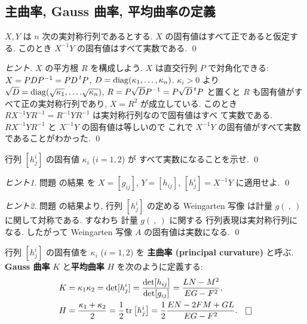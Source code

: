 \documentclass[12pt,twoside]{jarticle}
\begin{document}

\subsection{主曲率, Gauss 曲率, 平均曲率の定義}

\begin{question}[線形代数からの準備]
 \label{q:XinvY}
 $X,Y$ は $n$ 次の実対称行列であるとする.
 $X$ の固有値はすべて正であると仮定する.
 このとき $X^{-1}Y$ の固有値はすべて実数である.
 \qed
\end{question}

\begin{proof}[ヒント]
 $X$ の平方根 $R$ を構成しよう.
 $X$ は直交行列 $P$ で対角化できる: %
 $X=PDP^{-1}=PD\tp{P}$, $D=\mathop{\mathrm{diag}}\nolimits(\kappa_1,\ldots,\kappa_n)$.
 $\kappa_i>0$ より $\sqrt{D} = \mathop{\mathrm{diag}}\nolimits(\sqrt{\kappa_1},\ldots.\sqrt{\kappa_n})$, 
 $R = P\sqrt{D}P^{-1}=P\sqrt{D}\tp{P}$ と置くと %
 $R$ も固有値がすべて正の実対称行列であり, $X=R^2$ が成立している.
 このとき $RX^{-1}YR^{-1}=R^{-1}YR^{-1}$ は実対称行列なので固有値はすべ
 て実数である. $RX^{-1}YR^{-1}$ と $X^{-1}Y$ の固有値は等しいので
 これで $X^{-1}Y$ の固有値がすべて実数であることがわかった.
 \qed
\end{proof}

\begin{question}
 行列 $[h^i_j]$ の固有値 $\kappa_i$ ($i=1,2$) が
 すべて実数になることを示せ.
 \qed
\end{question}

\begin{proof}[ヒント1]
 問題  の結果
 を $X=[g_{ij}]$, $Y=[h_{ij}]$, $[h^i_j] = X^{-1}Y $ に適用せよ. \qed
\end{proof}

\begin{proof}[ヒント2]
 問題  の結果より, 行列 $[h^i_j]$ の定める Weingarten 写像
 は計量 $g(\ ,\ )$ に関して対称である. すなわち 計量 $g(\ ,\ )$ に関する
 行列表現は実対称行列になる. 
 したがって Weingarten 写像 $A$ の固有値は実数になる.
 \qed
\end{proof}

\begin{definition}
 行列 $[h^i_j]$ の固有値を $\kappa_i$ ($i=1,2$) を
 {\bf 主曲率 (principal curvature)} と呼ぶ. 
 {\bf Gauss 曲率} $K$ と{\bf 平均曲率} $H$ を次のように定義する:
 \begin{align*}
  &
  K = \kappa_1\kappa_2
    = \det[h^i_j]
    = \frac{\det[h_{ij}]}{\det[g_{ij}]}
    = \frac{LN-M^2}{EG-F^2},
  \\ &
  H = \frac{\kappa_1+\kappa_2}{2}
    = \frac{1}{2}\trace\big[h^i_j\big]
    = \frac{1}{2}\frac{EN-2FM+GL}{EG-F^2}.
   \qed
 \end{align*}
\end{definition}
\end{document}
